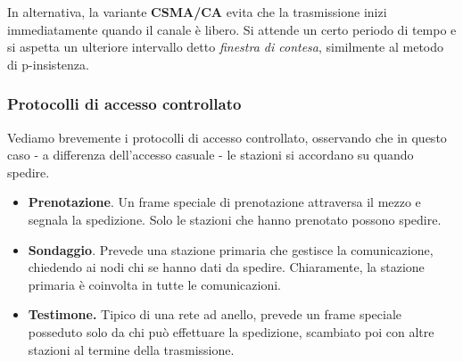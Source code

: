                 In alternativa, la variante \textbf{CSMA/CA} evita che la trasmissione inizi immediatamente quando il canale è libero. Si attende un certo periodo di tempo e si aspetta un ulteriore intervallo detto \textit{finestra di contesa}, similmente al metodo di p-insistenza.
        
        \subsubsection{Protocolli di accesso controllato}
        
            Vediamo brevemente i protocolli di accesso controllato, osservando che in questo caso - a differenza dell'accesso casuale - le stazioni si accordano su quando spedire.
            
            \begin{itemize}
                \item 
                    \textbf{Prenotazione}. Un frame speciale di prenotazione attraversa il mezzo e segnala la spedizione. Solo le stazioni che hanno prenotato possono spedire.
                
                \item 
                    \textbf{Sondaggio}. Prevede una stazione primaria che gestisce la comunicazione, chiedendo ai nodi chi se hanno dati da spedire. Chiaramente, la stazione primaria è coinvolta in tutte le comunicazioni.
                    
                \item
                    \textbf{Testimone.} Tipico di una rete ad anello, prevede un frame speciale posseduto solo da chi può effettuare la spedizione, scambiato poi con altre stazioni al termine della trasmissione.
            \end{itemize}